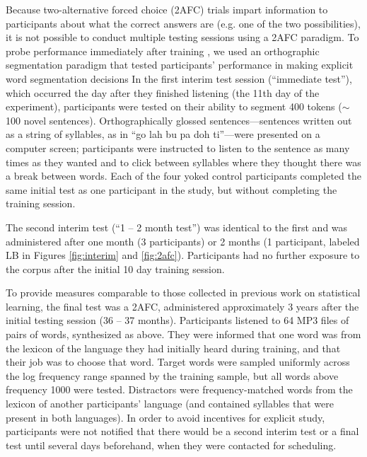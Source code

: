 \documentclass[10pt]{article}
\begin{document}
Because two-alternative forced choice (2AFC) trials impart information to participants about what the correct answers are (e.g. one of the two possibilities), it is not possible to conduct multiple testing sessions using a 2AFC paradigm. To probe performance immediately after training \cite{frank2010b,kurumada2011}, we used an orthographic segmentation paradigm that tested participants' performance in making explicit word segmentation decisions
In the first interim test session (``immediate test''), which occurred the day after they finished listening (the 11th day of the experiment), participants were tested on their ability to segment 400 tokens ($\sim$100 novel sentences). Orthographically glossed sentences---sentences written out as a string of syllables, as in ``go lah bu pa doh ti''---were presented on a computer screen; participants were instructed to listen to the sentence as many times as they wanted and to click between syllables where they thought there was a break between words. Each of the four yoked control participants completed the same initial test as one participant in the study, but without completing the training session. 

The second interim test (``1 -- 2 month test'') was identical to the first and was administered after one month (3 participants) or 2 months (1 participant, labeled LB in Figures \ref{fig:interim} and \ref{fig:2afc}). Participants had no further exposure to the corpus after the initial 10 day training session. 

To provide measures comparable to those collected in previous work on statistical learning, the final test was a 2AFC, administered approximately 3 years after the initial testing session (36 -- 37 months). Participants listened to 64 MP3 files of pairs of words, synthesized as above. They were informed that one word was from the lexicon of the language they had initially heard during training, and that their job was to choose that word. Target words were sampled uniformly across the log frequency range spanned by the training sample, but all words above frequency 1000 were tested. Distractors were frequency-matched words from the lexicon of another participants' language (and contained syllables that were present in both languages). In order to avoid incentives for explicit study, participants were not notified that there would be a second interim test or a final test until several days beforehand, when they were contacted for scheduling.
\end{document}
